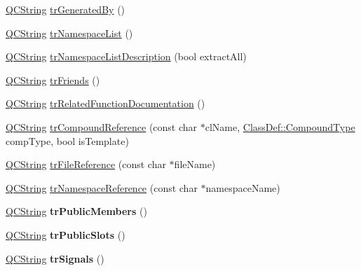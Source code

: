 \begin{DoxyCompactItemize}
\item 
\hyperlink{class_q_c_string}{Q\-C\-String} \hyperlink{class_translator_italian_a131935c84cc3cc61a5b62f41619cb163}{tr\-Generated\-By} ()
\item 
\hyperlink{class_q_c_string}{Q\-C\-String} \hyperlink{class_translator_italian_a39eed55e25c2d4229943f15d313d3f1f}{tr\-Namespace\-List} ()
\item 
\hyperlink{class_q_c_string}{Q\-C\-String} \hyperlink{class_translator_italian_a4deddc96cf84bd66a4ffb8174a5d052b}{tr\-Namespace\-List\-Description} (bool extract\-All)
\item 
\hyperlink{class_q_c_string}{Q\-C\-String} \hyperlink{class_translator_italian_a09300dedef1bc1ce5c2de5d70e6051bf}{tr\-Friends} ()
\item 
\hyperlink{class_q_c_string}{Q\-C\-String} \hyperlink{class_translator_italian_ae97d87449f2ff86c736e70fdeb6c2534}{tr\-Related\-Function\-Documentation} ()
\item 
\hyperlink{class_q_c_string}{Q\-C\-String} \hyperlink{class_translator_italian_ad81a0f65ba81e71d53ed3362a7d2b074}{tr\-Compound\-Reference} (const char $\ast$cl\-Name, \hyperlink{class_class_def_a768a6f0a6fd7e9087ff7971abbcc3f36}{Class\-Def\-::\-Compound\-Type} comp\-Type, bool is\-Template)
\item 
\hyperlink{class_q_c_string}{Q\-C\-String} \hyperlink{class_translator_italian_ab665cdc5cebda16bb4acbdc62718a2ba}{tr\-File\-Reference} (const char $\ast$file\-Name)
\item 
\hyperlink{class_q_c_string}{Q\-C\-String} \hyperlink{class_translator_italian_a8afd00694e0e220867c090eecfdd861a}{tr\-Namespace\-Reference} (const char $\ast$namespace\-Name)
\item 
\hypertarget{class_translator_italian_a21c92afb604c94e0636482e72081e182}{\hyperlink{class_q_c_string}{Q\-C\-String} {\bfseries tr\-Public\-Members} ()}\label{class_translator_italian_a21c92afb604c94e0636482e72081e182}

\item 
\hypertarget{class_translator_italian_a9ea325858f846bec828dadd21d58ec0f}{\hyperlink{class_q_c_string}{Q\-C\-String} {\bfseries tr\-Public\-Slots} ()}\label{class_translator_italian_a9ea325858f846bec828dadd21d58ec0f}

\item 
\hypertarget{class_translator_italian_a5b7fb21c5120618a98594bc60c956185}{\hyperlink{class_q_c_string}{Q\-C\-String} {\bfseries tr\-Signals} ()}\label{class_translator_italian_a5b7fb21c5120618a98594bc60c956185}


\end{DoxyCompactItemize}
